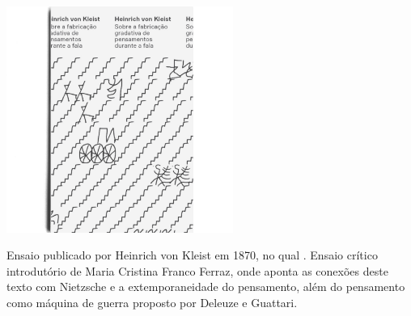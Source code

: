 \pagebreak

\begin{center}
\hspace*{-3.6cm}
\hspace*{3.1cm}\includegraphics[width=74mm]{./CAPAS/N-1_FABRICACAO.jpg}
\end{center}

\hspace*{-7cm}\hrulefill\hspace*{-7cm}

\medskip

\noindent{}Ensaio publicado por Heinrich von Kleist em 1870, no qual . Ensaio crítico introdutório de Maria Cristina Franco Ferraz, onde aponta as conexões deste texto com Nietzsche e a extemporaneidade do pensamento, além do pensamento como máquina de guerra proposto por Deleuze e Guattari. 



\vfill

